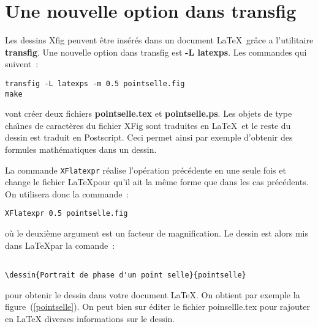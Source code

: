
\section{Une nouvelle option dans  transfig}

Les dessins Xfig peuvent \^etre ins\'er\'es dans un document
 \LaTeX\, gr\^ace a l'utilitaire {\bf transfig}. 
Une nouvelle option dans transfig est {\bf -L latexps}. Les commandes qui suivent~: 

\begin{verbatim}
transfig -L latexps -m 0.5 pointselle.fig
make 
\end{verbatim} 
vont cr\'eer  deux fichiers {\bf pointselle.tex } et {\bf pointselle.ps}. 
 Les objets de type  cha\^{\i}nes de caract\`eres du fichier XFig sont traduites 
 en \LaTeX\, et  le reste du dessin est traduit en Postscript. Ceci permet 
 ainsi par exemple d'obtenir des formules math\'ematiques dans un dessin.

La commande \verb+XFlatexpr+ r\'ealise l'op\'eration pr\'ec\'edente en une seule fois et change le fichier \LaTeX pour qu'il ait la m\^eme forme que dans 
 les cas pr\'ec\'edents. On utilisera donc la commande~:
\begin{verbatim}
XFlatexpr 0.5 pointselle.fig
\end{verbatim}
o\`u le deuxi\`eme argument est un facteur de magnification. Le dessin est alors mis dans \LaTeX par la comande~:
\begin{verbatim}

\dessin{Portrait de phase d'un point selle}{pointselle}
\end{verbatim} 
pour obtenir le dessin dans votre document \LaTeX. On obtient par exemple 
 la figure~(\ref{pointselle}).
 On peut bien sur \'editer le fichier poinsellle.tex pour rajouter en \LaTeX  
 diverses informations sur le dessin. 






